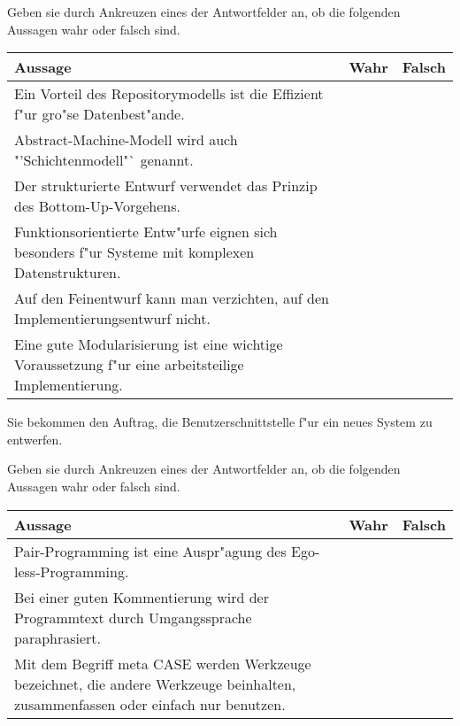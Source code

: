 \documentclass[12pt]{exam}
\begin{document}
\begin{questions}
\question[6] Geben sie durch Ankreuzen eines der Antwortfelder an, ob die folgenden Aussagen wahr oder falsch sind. \\
\addpoints
\begin{tabular}{| p{12cm} | l | l |} \hline
    Aussage & Wahr & Falsch \\ \hline
    Ein Vorteil des Repositorymodells ist die Effizient f"ur gro"se Datenbest"ande. & & \\ \hline
    Abstract-Machine-Modell wird auch "'Schichtenmodell"` genannt. & & \\ \hline
    Der strukturierte Entwurf verwendet das Prinzip des Bottom-Up-Vorgehens. & & \\ \hline
    Funktionsorientierte Entw"urfe eignen sich besonders f"ur Systeme mit komplexen Datenstrukturen. & & \\ \hline
    Auf den Feinentwurf kann man verzichten, auf den Implementierungsentwurf nicht. & & \\ \hline
    Eine gute Modularisierung ist eine wichtige Voraussetzung f"ur eine arbeitsteilige Implementierung. & & \\ \hline
\end{tabular}

\question[3] Sie bekommen den Auftrag, die Benutzerschnittstelle f"ur ein neues System zu entwerfen.
\noaddpoints
{}

\question[3] Geben sie durch Ankreuzen eines der Antwortfelder an, ob die folgenden Aussagen wahr oder falsch sind. \\
\addpoints
\begin{tabular}{| p{12cm} | l | l |} \hline
    Aussage & Wahr & Falsch \\ \hline
    Pair-Programming ist eine Auspr"agung des Ego-less-Programming. & & \\ \hline
    Bei einer guten Kommentierung wird der Programmtext durch Umgangssprache paraphrasiert. & & \\ \hline
    Mit dem Begriff meta CASE werden Werkzeuge bezeichnet, die andere Werkzeuge beinhalten, zusammenfassen oder einfach nur benutzen. & & \\ \hline
\end{tabular}


\end{questions}
\end{document}
